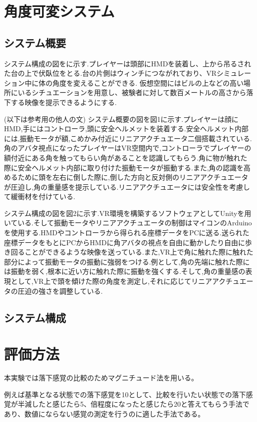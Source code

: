 \documentclass[uplatex]{jsarticle}
\begin{document}
 

\section{角度可変システム}
\subsection{システム概要}
システム構成の図をに示す.プレイヤーは頭部にHMDを装着し、上から吊るされた台の上で伏臥位をとる.台の片側はウィンチにつながれており、VRシミュレーション中に体の角度を変えることができる.
仮想空間にはビルの上などの高い場所にいるシチュエーションを用意し、被験者に対して数百メートルの高さから落下する映像を提示できるようにする.

(以下は参考用の他人の文)
 システム概要の図を図1に示す.プレイヤーは顔にHMD,手にはコントローラ,頭に安全ヘルメットを装着する.安全ヘルメット内部には,振動モータが額,こめかみ付近にリニアアクチュエータ二個搭載されている.角のアバタ視点になったプレイヤーはVR空間内で,コントローラでプレイヤーの額付近にある角を触ってもらい角があることを認識してもらう.角に物が触れた際に安全ヘルメット内部に取り付けた振動モータが振動する.また,角の認識を高めるために頭を左右に倒した際に,倒した方向と反対側のリニアアクチュエータが圧迫し,角の重量感を提示している.リニアアクチュエータには安全性を考慮して緩衝材を付けている.

 システム構成の図を図2に示す.VR環境を構築するソフトウェアとしてUnityを用いている.そして振動モータやリニアアクチュエータの制御はマイコンのArduinoを使用する.HMDやコントローラから得られる座標データをPCに送る.送られた座標データをもとにPCからHMDに角アバタの視点を自由に動かしたり自由に歩き回ることができるような映像を送っている.また,VR上で角に触れた際に触れた部分によって振動モータの振動に強弱をつける.例として,角の先端に触れた際には振動を弱く,根本に近い方に触れた際に振動を強くする.そして,角の重量感の表現として,VR上で頭を傾けた際の角度を測定し,それに応じてリニアアクチュエータの圧迫の強さを調整している.

\subsection{システム構成}


\section{評価方法}
本実験では落下感覚の比較のためマグニチュード法を用いる。

例えば基準となる状態での落下感覚を10として、比較を行いたい状態での落下感覚が半減したと感じたら5、倍程度になったと感じたら20と答えてもらう手法であり、数値にならない感覚の測定を行うのに適した手法である。
\end{document}
